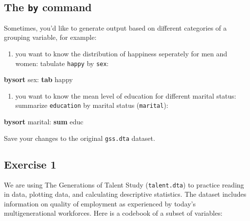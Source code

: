 \documentclass[
]{book}
\newenvironment{Shaded}{\begin{snugshade}}{\end{snugshade}}
\newcommand{\KeywordTok}[1]{\textcolor[rgb]{0.13,0.29,0.53}{\textbf{#1}}}
\newcommand{\NormalTok}[1]{#1}
\providecommand{\tightlist}{%
  \setlength{\itemsep}{0pt}\setlength{\parskip}{0pt}}
\begin{document}
\hypertarget{the-by-command}{%
\subsection{\texorpdfstring{The \texttt{by} command}{The by command}}\label{the-by-command}}

Sometimes, you'd like to generate output based on different categories of a grouping variable, for example:

\begin{enumerate}
\def\labelenumi{\arabic{enumi}.}
\tightlist
\item
  you want to know the distribution of happiness seperately for men and women: tabulate \texttt{happy} by \texttt{sex}:
\end{enumerate}

\begin{Shaded}
\begin{Highlighting}[]
\KeywordTok{bysort}\NormalTok{ sex: }\KeywordTok{tab}\NormalTok{ happy}
\end{Highlighting}
\end{Shaded}

\begin{enumerate}
\def\labelenumi{\arabic{enumi}.}
\setcounter{enumi}{1}
\tightlist
\item
  you want to know the mean level of education for different marital status: summarize \texttt{education} by marital status (\texttt{marital}):
\end{enumerate}

\begin{Shaded}
\begin{Highlighting}[]
\KeywordTok{bysort}\NormalTok{ marital: }\KeywordTok{sum}\NormalTok{ educ }
\end{Highlighting}
\end{Shaded}

Save your changes to the original \texttt{gss.dta} dataset.

\hypertarget{exercise-1-6}{%
\subsection{Exercise 1}\label{exercise-1-6}}

We are using The Generations of Talent Study (\texttt{talent.dta}) to practice reading in data, plotting data, and calculating descriptive statistics. The dataset includes information on quality of employment as experienced by today's multigenerational workforces. Here is a codebook of a subset of variables:
\end{document}
